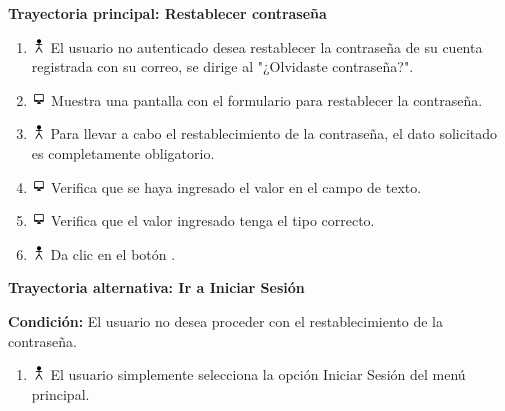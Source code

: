 \textbf{Trayectoria principal: Restablecer contraseña}
\begin{enumerate}
\item \includegraphics[height=1em]{pictures/actor.png} El usuario no autenticado desea restablecer la contraseña de su cuenta registrada con su correo, se dirige al "¿Olvidaste contraseña?".
\item \includegraphics[height=1em]{pictures/sistema.png} Muestra una pantalla con el formulario para restablecer la contraseña.
\item \includegraphics[height=1em]{pictures/actor.png} Para llevar a cabo el restablecimiento de la contraseña, el dato solicitado es completamente obligatorio.
\item \includegraphics[height=1em]{pictures/sistema.png} Verifica que se haya ingresado el valor en el campo de texto.
\item \includegraphics[height=1em]{pictures/sistema.png} Verifica que el valor ingresado tenga el tipo correcto.
\item \includegraphics[height=1em]{pictures/actor.png} Da clic en el botón .
\end{enumerate} \bigskip

\textbf{Trayectoria alternativa: Ir a Iniciar Sesión} 

\vspace{0.3em}

\textbf{Condición:} El usuario no desea proceder con el restablecimiento de la contraseña.
\begin{enumerate}
\item \includegraphics[height=1em]{pictures/actor.png} El usuario simplemente selecciona la opción Iniciar Sesión del menú principal.
\end{enumerate} \bigskip

